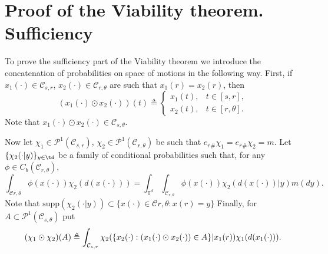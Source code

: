 \documentclass[12pt]{article}
\newcommand{\inttd}{\int_{\mathbb{T}^d}}
\newcommand{\pc}[2]{\mathcal{P}^1(\mathcal{C}_{{#1},{#2}})}
\begin{document}
\section{Proof of the Viability theorem. Sufficiency}\label{sect:sufficiency}
To prove the sufficiency part of the Viability theorem we introduce  the concatenation of probabilities on space of motions in the following way. First, if $x_1(\cdot)\in\mathcal{C}_{s,r}$, $x_2(\cdot)\in\mathcal{C}_{r,\theta}$ are such that $x_1(r)=x_2(r)$, then
$$(x_1(\cdot)\odot x_2(\cdot))(t)\triangleq \left\{\begin{array}{cc}
x_1(t),& t\in [s,r],\\
x_2(t),& t\in [r,\theta].
\end{array}
\right. $$ Note that $x_1(\cdot)\odot x_2(\cdot)\in \mathcal{C}_{s,\theta}$.

Now let $\chi_1\in\pc{s}{r}$, $\chi_2\in\pc{r}{\theta}$ be such that $e_r{}_\#\chi_1=e_r{}_\#\chi_2=m$. Let $\{\chi_2(\cdot|y)\}_{y\in\td}$ be a family of conditional probabilities such that, for any $\phi\in C_b(\mathcal{C}_{r,\theta})$,
$$\int_{\mathcal{C}{r,\theta}}\phi(x(\cdot))\chi_2(d(x(\cdot)))= \inttd\int_{\mathcal{C}_{r,\theta}}\phi(x(\cdot))\chi_2(d(x(\cdot))|y)m(dy). $$ Note that $\mathrm{supp}(\chi_2(\cdot|y))\subset \{x(\cdot)\in\mathcal{C}{r,\theta}:x(r)=y\}$
Finally, for $A\subset\pc{s}{\theta}$ put 
$$(\chi_1\odot\chi_2)(A)\\\triangleq \int_{\mathcal{C}_{s,r}} \chi_2(\{x_2(\cdot):(x_1(\cdot)\odot x_2(\cdot))\in A\}|x_1(r))\chi_1(d(x_1(\cdot))).$$
\end{document}
